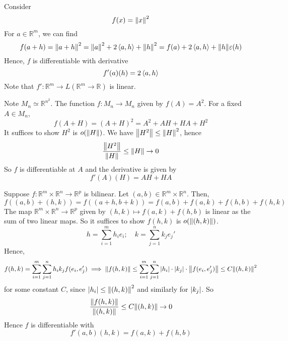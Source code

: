 \begin{example}
	Consider
	\[
		f(x) = \norm{x}^2
	\]
	For \( a \in \mathbb R^m \), we can find
	\[
		f(a+h) = \norm{a+h}^2 = \norm{a}^2 + 2\left\langle{a,h}\right\rangle + \norm{h}^2 = f(a) + 2\left\langle{a,h}\right\rangle + \norm{h} \varepsilon(h)
	\]
	Hence, \( f \) is differentiable with derivative
	\[
		f'(a)(h) = 2\left\langle{a,h}\right\rangle
	\]
	Note that \( f' \colon \mathbb R^m \to L(\mathbb R^m \to \mathbb R) \) is linear.
\end{example}
\begin{example}
	Note \( M_n \simeq \mathbb R^{n^2} \).
	The function \( f \colon M_n \to M_n \) given by \( f(A) = A^2 \).
	For a fixed \( A \in M_n \),
	\[
		f(A+H) = (A+H)^2 = A^2 + AH + HA + H^2
	\]
	It suffices to show \( H^2 \) is \( o(\norm{H}) \).
	We have \( \norm{H^2} \leq \norm{H}^2 \), hence
	\[
		\frac{\norm{H^2}}{\norm{H}} \leq \norm{H} \to 0
	\]
	So \( f \) is differentiable at \( A \) and the derivative is given by
	\[
		f'(A)(H) = AH + HA
	\]
\end{example}
\begin{example}
	Suppose \( f \colon \mathbb R^m \times \mathbb R^n \to \mathbb R^p \) is bilinear.
	Let \( (a, b) \in \mathbb R^m \times \mathbb R^n \).
	Then,
	\[
		f((a,b) + (h,k)) = f((a+h, b+k)) = f(a,b) + f(a,k) + f(h,b) + f(h,k)
	\]
	The map \( \mathbb R^m \times \mathbb R^n \to \mathbb R^p \) given by \( (h,k) \mapsto f(a,k) + f(h,b) \) is linear as the sum of two linear maps.
	So it suffices to show \( f(h,k) \) is \( o(\norm{(h,k)}) \).
	\[
		h = \sum_{i=1}^m h_i e_i;\quad k = \sum_{j=1}^n k_j e_j'
	\]
	Hence,
	\[
		f(h,k) = \sum_{i=1}^m \sum_{j=1}^n h_i k_j f(e_i, e_j') \implies \norm{f(h,k)} \leq \sum_{i=1}^m \sum_{j=1}^n \abs{h_i} \cdot \abs{k_j} \cdot \norm{f(e_i, e_j')} \leq C \norm{(h,k)}^2
	\]
	for some constant \( C \), since \( \abs{h_i} \leq \norm{(h,k)}^2 \) and similarly for \( \abs{k_j} \).
	So
	\[
		\frac{\norm{f(h,k)}}{\norm{(h,k)}} \leq C \norm{(h,k)} \to 0
	\]
	Hence \( f \) is differentiable with
	\[
		f'(a,b)(h,k) = f(a,k) + f(h,b)
	\]
\end{example}
